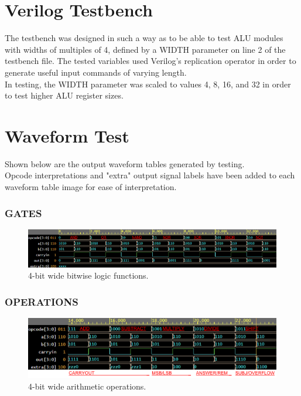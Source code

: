 \documentclass[12pt]{article}
\begin{document}
\section{Verilog Testbench}
The testbench was designed in such a way as to be able to test ALU modules with widths of multiples of 4, defined by a WIDTH parameter on line 2 of the testbench file. The tested variables used Verilog's replication operator in order to generate useful input commands of varying length. \\
In testing, the WIDTH parameter was scaled to values 4, 8, 16, and 32 in order to test higher ALU register sizes.




\newpage

\section{Waveform Test}
Shown below are the output waveform tables generated by testing. \\
Opcode interpretations and "extra" output signal labels have been added to each waveform table image for ease of interpretation.
\subsubsection{GATES}
    \begin{figure}[H]
        \centering
        \includegraphics[width = 1.0\textwidth]{figs/CompArch FInal Test Cases 4x labeled GATES (resized).png}
        \caption{4-bit wide bitwise logic functions.}
        \label{fig:enter-label}
    \end{figure}

\subsubsection{OPERATIONS}
    \begin{figure}[H]
        \centering
        \includegraphics[width = 1.0\textwidth]{figs/CompArch Final Test Cases 4x labeled OPERATIONS (resized).png }
        \caption{4-bit wide arithmetic operations.}
        \label{fig:enter-label}
    \end{figure}
\end{document}
